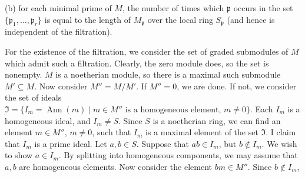 {{\hypertarget{result-I-7.4b}{}(b) for each minimal prime of $M$, the number of times which $\mathfrak p$ occurs in the set $\{\mathfrak p_1,\ldots,\mathfrak p_r\}$ is equal to the length of $M_{\mathfrak p}$ over the local ring $S_{\mathfrak p}$ (and hence is independent of the filtration).\par}

\Proof For the existence of the filtration, we consider the set of graded submodules of $M$ which admit such a filtration. Clearly, the zero module does, so the set is nonempty. $M$ is a noetherian module, so there is a maximal such submodule $M'\subseteq M$. Now consider $M''=M/M'$. If $M''=0$, we are done. If not, we consider the set of ideals $\mathfrak I=\{I_m=\operatorname{Ann}(m)\mid m\in M''\text{ is a homogeneous element, }m\ne0\}$. Each $I_m$ is a homogeneous ideal, and $I_m\ne S$. Since $S$ is a noetherian ring, we can find an element $m\in M''$, $m\ne0$, such that $I_m$ is a maximal element of the set $\mathfrak I$. I claim that $I_m$ is a prime ideal. Let $a,b\in S$. Suppose that $ab\in I_m$, but $b\notin I_m$. We wish to show $a\in I_m$. By splitting into homogeneous components, we may assume that $a,b$ are homogeneous elements. Now consider the element $bm\in M''$. Since $b\notin I_m$,
}
